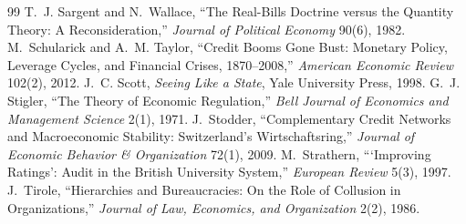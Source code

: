 \documentclass[11pt]{article}
\theoremstyle{definition}
\begin{document}
\begin{thebibliography}{99}
 T.~J. Sargent and N.~Wallace, ``The Real-Bills Doctrine versus the Quantity Theory: A Reconsideration,'' \emph{Journal of Political Economy} 90(6), 1982.
 M.~Schularick and A.~M. Taylor, ``Credit Booms Gone Bust: Monetary Policy, Leverage Cycles, and Financial Crises, 1870--2008,'' \emph{American Economic Review} 102(2), 2012.
 J.~C. Scott, \emph{Seeing Like a State}, Yale University Press, 1998.
 G.~J. Stigler, ``The Theory of Economic Regulation,'' \emph{Bell Journal of Economics and Management Science} 2(1), 1971.
 J.~Stodder, ``Complementary Credit Networks and Macroeconomic Stability: Switzerland's Wirtschaftsring,'' \emph{Journal of Economic Behavior \& Organization} 72(1), 2009.
 M.~Strathern, ```Improving Ratings': Audit in the British University System,'' \emph{European Review} 5(3), 1997.
 J.~Tirole, ``Hierarchies and Bureaucracies: On the Role of Collusion in Organizations,'' \emph{Journal of Law, Economics, and Organization} 2(2), 1986.
\end{thebibliography}
\end{document}

